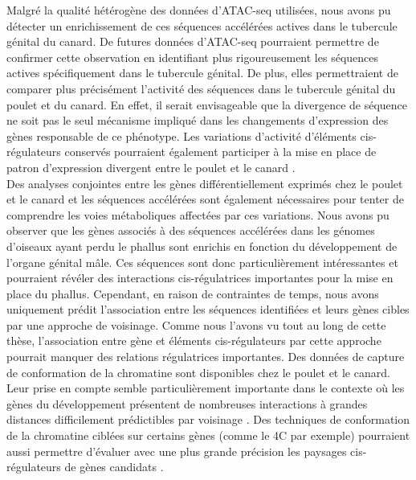 Malgré la qualité hétérogène des données d’ATAC-seq utilisées, nous avons pu détecter un enrichissement de ces séquences accélérées actives dans le tubercule génital du canard. De futures données d’ATAC-seq pourraient permettre de confirmer cette observation en identifiant plus rigoureusement les séquences actives spécifiquement dans le tubercule génital. De plus, elles permettraient de comparer plus précisément l’activité des séquences dans le tubercule génital du poulet et du canard. En effet, il serait envisageable que la divergence de séquence ne soit pas le seul mécanisme impliqué dans les changements d’expression des gènes responsable de ce phénotype. Les variations d’activité d’éléments \gls{cis}-régulateurs conservés pourraient également participer à la mise en place de patron d’expression divergent entre le poulet et le canard \citep{villar_enhancer_2015}. \\

Des analyses conjointes entre les gènes différentiellement exprimés chez le poulet et le canard et les séquences accélérées sont également nécessaires pour tenter de comprendre les voies métaboliques affectées par ces variations. Nous avons pu observer que les gènes associés à des séquences accélérées dans les génomes d’oiseaux ayant perdu le phallus sont enrichis en fonction du développement de l’organe génital mâle. Ces séquences sont donc particulièrement intéressantes et pourraient révéler des interactions \gls{cis}-régulatrices importantes pour la mise en place du phallus. Cependant, en raison de contraintes de temps, nous avons uniquement prédit l’association entre les séquences identifiées et leurs gènes cibles par une approche de voisinage. Comme nous l’avons vu tout au long de cette thèse, l’association entre gène et éléments \gls{cis}-régulateurs par cette approche pourrait manquer des relations régulatrices importantes. Des données de capture de conformation de la chromatine sont disponibles chez le poulet et le canard. Leur prise en compte semble particulièrement importante dans le contexte où les gènes du développement présentent de nombreuses interactions à grandes distances difficilement prédictibles par voisinage \citep{montavon_landscapes_2012, de_laat_topology_2013}. Des techniques de conformation de la chromatine ciblées sur certains gènes (comme le 4C par exemple) pourraient aussi permettre d’évaluer avec une plus grande précision les paysages \gls{cis}-régulateurs de gènes candidats \citep{simonis_nuclear_2006,gondor_high-resolution_2008}.\\

